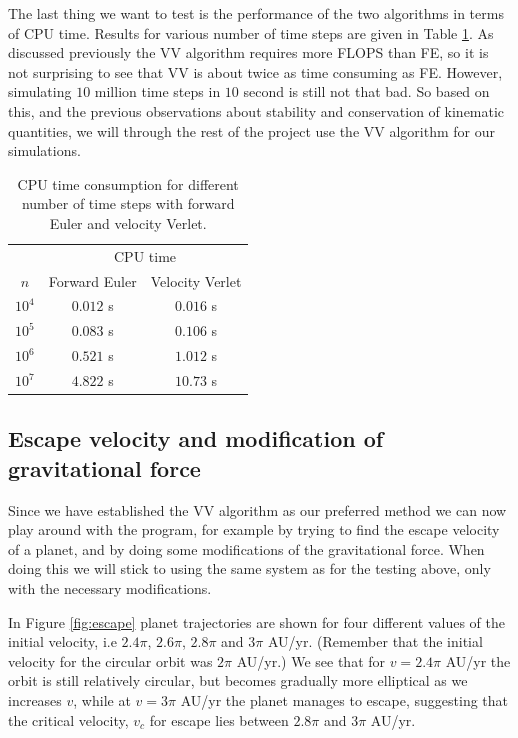 \documentclass[12pt, a4paper]{article}
\begin{document}
The last thing we want to test is the performance of the two algorithms in terms of CPU time. Results 
for various number of time steps are given in Table \ref{tab:CPUtime}. As discussed previously the 
VV algorithm requires more FLOPS than FE, so it is not surprising to see that VV is about twice as time 
consuming as FE. However, simulating $10$ million time steps in $10$ second is still not that bad. So  
based on this, and the previous observations about stability and conservation of kinematic quantities, 
we will through the rest of the project use the VV algorithm for our simulations.  

\begin{table}[ht!]
\caption{CPU time consumption for different number of time steps with forward Euler and velocity Verlet.}
\label{tab:CPUtime}
\begin{center}
\begin{tabular}{ccc} \\ \hline \hline 
	&\multicolumn{2}{c}{CPU time} \\
$n$ & Forward Euler & Velocity Verlet \\ \hline  
$10^4$ & $0.012$ s & $0.016$ s \\ 
$10^5$ & $0.083$ s & $0.106$ s \\ 
$10^6$ & $0.521$ s & $1.012$ s \\ 
$10^7$ & $4.822$ s & $10.73$ s \\ \hline\hline 
\end{tabular}
\end{center}
\end{table}

\subsection{Escape velocity and modification of gravitational force}

Since we have established the VV algorithm as our preferred method we can now play around with the 
program, for example by trying to find the escape velocity of a planet, and by doing some modifications of 
the gravitational force. When doing this we will stick to using the same system as for the testing 
above, only with the necessary modifications. 

In Figure \ref{fig:escape} planet trajectories are shown for four different values of the initial 
velocity, i.e $2.4\pi$, $2.6\pi$, $2.8\pi$ and $3\pi$ AU/yr. (Remember that the initial velocity for the 
circular orbit was $2\pi$ AU/yr.) We see that for $v=2.4\pi$ AU/yr the orbit is still relatively 
circular, but becomes gradually more elliptical as we increases $v$, while at $v=3\pi$ AU/yr the 
planet manages to escape, suggesting that the critical velocity, $v_c$ for escape lies between 
$2.8\pi$ and $3\pi$ AU/yr.  
\end{document}
